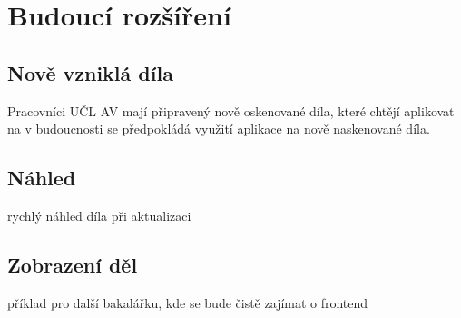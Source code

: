 
\chapter{Budoucí rozšíření}
    
    
    \section{Nově vzniklá díla}
        Pracovníci UČL AV mají připravený nově oskenované díla, které chtějí aplikovat na 
        v budoucnosti se předpokládá využití aplikace na nově naskenované díla.

    
    \section{Náhled}
        rychlý náhled díla při aktualizaci
        
    \section{Zobrazení děl}
        příklad pro další bakalářku, kde se bude čistě zajímat o frontend

